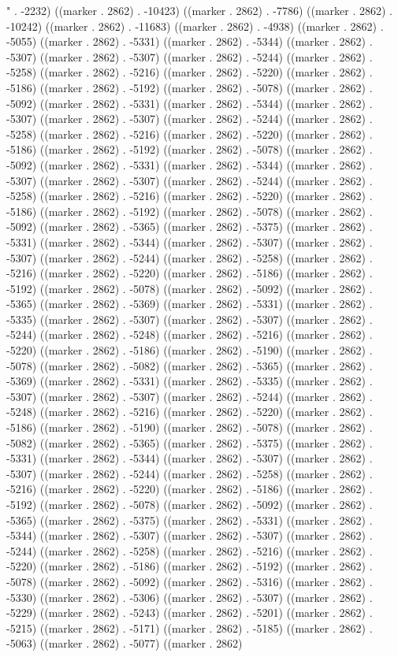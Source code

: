 " . -2232) ((marker . 2862) . -10423) ((marker . 2862) . -7786) ((marker . 2862) . -10242) ((marker . 2862) . -11683) ((marker . 2862) . -4938) ((marker . 2862) . -5055) ((marker . 2862) . -5331) ((marker . 2862) . -5344) ((marker . 2862) . -5307) ((marker . 2862) . -5307) ((marker . 2862) . -5244) ((marker . 2862) . -5258) ((marker . 2862) . -5216) ((marker . 2862) . -5220) ((marker . 2862) . -5186) ((marker . 2862) . -5192) ((marker . 2862) . -5078) ((marker . 2862) . -5092) ((marker . 2862) . -5331) ((marker . 2862) . -5344) ((marker . 2862) . -5307) ((marker . 2862) . -5307) ((marker . 2862) . -5244) ((marker . 2862) . -5258) ((marker . 2862) . -5216) ((marker . 2862) . -5220) ((marker . 2862) . -5186) ((marker . 2862) . -5192) ((marker . 2862) . -5078) ((marker . 2862) . -5092) ((marker . 2862) . -5331) ((marker . 2862) . -5344) ((marker . 2862) . -5307) ((marker . 2862) . -5307) ((marker . 2862) . -5244) ((marker . 2862) . -5258) ((marker . 2862) . -5216) ((marker . 2862) . -5220) ((marker . 2862) . -5186) ((marker . 2862) . -5192) ((marker . 2862) . -5078) ((marker . 2862) . -5092) ((marker . 2862) . -5365) ((marker . 2862) . -5375) ((marker . 2862) . -5331) ((marker . 2862) . -5344) ((marker . 2862) . -5307) ((marker . 2862) . -5307) ((marker . 2862) . -5244) ((marker . 2862) . -5258) ((marker . 2862) . -5216) ((marker . 2862) . -5220) ((marker . 2862) . -5186) ((marker . 2862) . -5192) ((marker . 2862) . -5078) ((marker . 2862) . -5092) ((marker . 2862) . -5365) ((marker . 2862) . -5369) ((marker . 2862) . -5331) ((marker . 2862) . -5335) ((marker . 2862) . -5307) ((marker . 2862) . -5307) ((marker . 2862) . -5244) ((marker . 2862) . -5248) ((marker . 2862) . -5216) ((marker . 2862) . -5220) ((marker . 2862) . -5186) ((marker . 2862) . -5190) ((marker . 2862) . -5078) ((marker . 2862) . -5082) ((marker . 2862) . -5365) ((marker . 2862) . -5369) ((marker . 2862) . -5331) ((marker . 2862) . -5335) ((marker . 2862) . -5307) ((marker . 2862) . -5307) ((marker . 2862) . -5244) ((marker . 2862) . -5248) ((marker . 2862) . -5216) ((marker . 2862) . -5220) ((marker . 2862) . -5186) ((marker . 2862) . -5190) ((marker . 2862) . -5078) ((marker . 2862) . -5082) ((marker . 2862) . -5365) ((marker . 2862) . -5375) ((marker . 2862) . -5331) ((marker . 2862) . -5344) ((marker . 2862) . -5307) ((marker . 2862) . -5307) ((marker . 2862) . -5244) ((marker . 2862) . -5258) ((marker . 2862) . -5216) ((marker . 2862) . -5220) ((marker . 2862) . -5186) ((marker . 2862) . -5192) ((marker . 2862) . -5078) ((marker . 2862) . -5092) ((marker . 2862) . -5365) ((marker . 2862) . -5375) ((marker . 2862) . -5331) ((marker . 2862) . -5344) ((marker . 2862) . -5307) ((marker . 2862) . -5307) ((marker . 2862) . -5244) ((marker . 2862) . -5258) ((marker . 2862) . -5216) ((marker . 2862) . -5220) ((marker . 2862) . -5186) ((marker . 2862) . -5192) ((marker . 2862) . -5078) ((marker . 2862) . -5092) ((marker . 2862) . -5316) ((marker . 2862) . -5330) ((marker . 2862) . -5306) ((marker . 2862) . -5307) ((marker . 2862) . -5229) ((marker . 2862) . -5243) ((marker . 2862) . -5201) ((marker . 2862) . -5215) ((marker . 2862) . -5171) ((marker . 2862) . -5185) ((marker . 2862) . -5063) ((marker . 2862) . -5077) ((marker . 2862) 